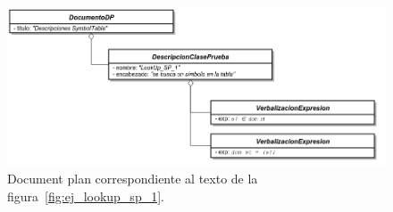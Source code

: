 \begin{figure}[H]
  	\centering
	\includegraphics[scale=0.4]{img/document_plan_ej.png}
	\caption{Document plan correspondiente al texto de la figura~\ref{fig:ej_lookup_sp_1}.}
  	\label{fig:png_document_plan_ej}
\end{figure}



